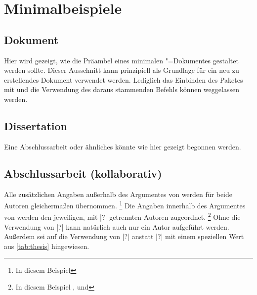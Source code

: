 \chapter{%
  Minimalbeispiele%
  \label{sec:exmpl}%
}
\section{%
  Dokument%
}

Hier wird gezeigt, wie die Präambel eines minimalen "=Dokumentes 
gestaltet werden sollte. Dieser Ausschnitt kann prinzipiell als Grundlage für 
ein neu zu erstellendes Dokument verwendet werden. Lediglich das Einbinden des 
Paketes  mit  und 
die Verwendung des daraus stammenden Befehls  können 
weggelassen werden.



\section{%
  Dissertation%
  \label{sec:exmpl:dissertation}%
}

Eine Abschlussarbeit oder ähnliches könnte wie hier gezeigt begonnen werden.



\section{%
  Abschlussarbeit (kollaborativ)%
  \label{sec:exmpl:thesis}%
}

Alle zusätzlichen Angaben außerhalb des Argumentes von  werden 
für beide Autoren gleichermaßen übernommen.%
\footnote{In diesem Beispiel }
Die Angaben innerhalb des Argumentes von  werden den jeweiligen, 
mit |?| getrennten Autoren zugeordnet.%
\footnote{%
  In diesem Beispiel ,  und 
}
Ohne die Verwendung von |?| kann natürlich auch nur ein Autor 
aufgeführt werden. Außerdem sei auf die Verwendung von |?| 
anstatt |?| mit einem speziellen Wert aus \autoref{tab:thesis} 
hingewiesen.




